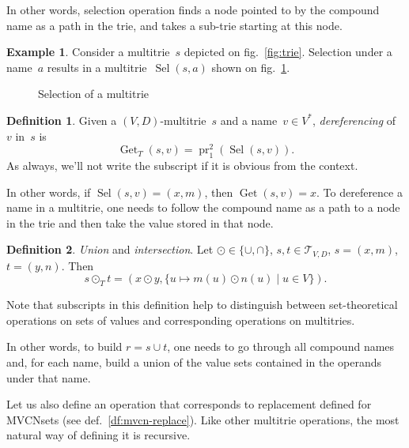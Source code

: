 \documentclass{article}
\theoremstyle{definition}
\newtheorem{Df}{Definition}
\newtheorem{Ex}{Example}
\newcommand{\setcharmt}{T}
\newcommand{\setsymbol}[3]{\mathcal{#1}_{#2,#3}}
\newcommand{\setmt}[2]{\setsymbol{\setcharmt}{#1}{#2}}
\newcommand{\select}{\operatorname{Sel}}
\newcommand{\deref}{\operatorname{Get}}
\newcommand{\proj}[2]{\operatorname{pr}^{#1}_{#2}}
\begin{document}
In other words, selection operation finds a node pointed to by the
compound name as a path in the trie, and takes a sub-trie starting
at this node.

\begin{Ex}\label{ex:mt-select}
Consider a multitrie~$s$ depicted on fig.~\ref{fig:trie}. Selection under a
name~$a$ results in a multitrie~$\select(s,a)$ shown on
fig.~\ref{fig:mt-select}.
\end{Ex}

\begin{figure}[ht]
\begin{center}
\begin{minipage}{17em}
\end{minipage}
\end{center}
\caption{Selection of a multitrie}\label{fig:mt-select}
\end{figure}

\begin{Df}\label{df:mt-deref}
Given a $(V,D)$-multitrie~$s$ and a name~$v\in V^\ast$, \emph{dereferencing}
of~$v$ in~$s$ is
\[
  \deref_\setcharmt(s, v) = \proj{2}{1}(\select(s, v)) .
\]
As always, we'll not write the subscript if it is obvious from the context.
\end{Df}

In other words, if $\select(s,v) = (x,m)$, then $\deref(s, v) = x$. To
dereference a name in a multitrie, one needs to follow the compound name
as a path to a node in the trie and then take the value stored in that node.

\begin{Df}\label{df:mt-setop}
\emph{Union} and \emph{intersection}.
Let
$\odot \in \{ \cup, \cap \}$,
$s, t \in \setmt{V}{D}$,
$s = (x, m)$, $t = (y, n)$.
Then
\[
  s \odot_\setcharmt  t =
    (x \odot y, \{ u \mapsto m(u) \odot n(u) \mid u \in V \}) .
\]
\end{Df}
Note that subscripts in this definition help to distinguish between
set-theoretical operations on sets of values and corresponding operations
on multitries.

In other words, to build $r = s \cup t$, one needs to go through all compound
names and, for each name, build a union of the value sets contained in the
operands under that name.

Let us also define an operation that corresponds to replacement
defined for MVCNsets (see def.~\ref{df:mvcn-replace}). Like other multitrie
operations, the most natural way of defining it is recursive.
\end{document}
